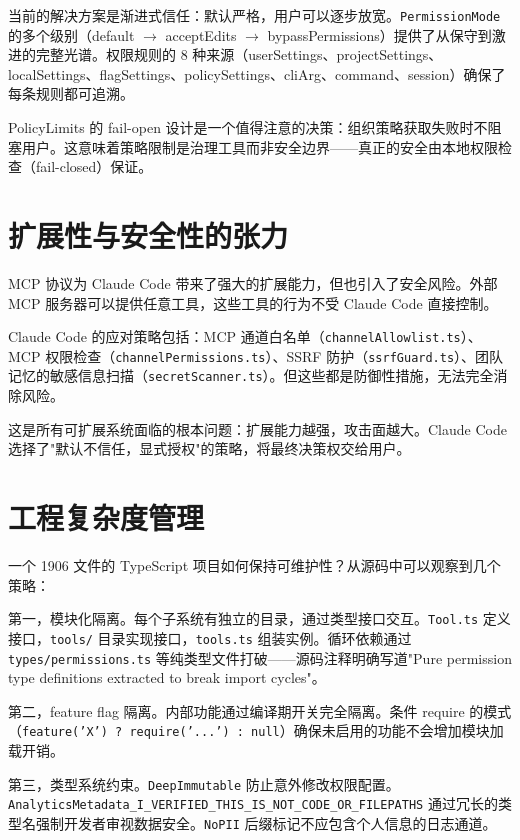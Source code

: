 当前的解决方案是渐进式信任：默认严格，用户可以逐步放宽。\texttt{PermissionMode} 的多个级别（default $\rightarrow$ acceptEdits $\rightarrow$ bypassPermissions）提供了从保守到激进的完整光谱。权限规则的 8 种来源（userSettings、projectSettings、localSettings、flagSettings、policySettings、cliArg、command、session）确保了每条规则都可追溯。

PolicyLimits 的 fail-open 设计是一个值得注意的决策：组织策略获取失败时不阻塞用户。这意味着策略限制是治理工具而非安全边界——真正的安全由本地权限检查（fail-closed）保证。

\section{扩展性与安全性的张力}

MCP 协议为 Claude Code 带来了强大的扩展能力，但也引入了安全风险。外部 MCP 服务器可以提供任意工具，这些工具的行为不受 Claude Code 直接控制。

Claude Code 的应对策略包括：MCP 通道白名单（\texttt{channelAllowlist.ts}）、MCP 权限检查（\texttt{channelPermissions.ts}）、SSRF 防护（\texttt{ssrfGuard.ts}）、团队记忆的敏感信息扫描（\texttt{secretScanner.ts}）。但这些都是防御性措施，无法完全消除风险。

这是所有可扩展系统面临的根本问题：扩展能力越强，攻击面越大。Claude Code 选择了"默认不信任，显式授权"的策略，将最终决策权交给用户。

\section{工程复杂度管理}

一个 1906 文件的 TypeScript 项目如何保持可维护性？从源码中可以观察到几个策略：

第一，模块化隔离。每个子系统有独立的目录，通过类型接口交互。\texttt{Tool.ts} 定义接口，\texttt{tools/} 目录实现接口，\texttt{tools.ts} 组装实例。循环依赖通过 \texttt{types/permissions.ts} 等纯类型文件打破——源码注释明确写道"Pure permission type definitions extracted to break import cycles"。

第二，feature flag 隔离。内部功能通过编译期开关完全隔离。条件 require 的模式（\texttt{feature('X') ? require('...') : null}）确保未启用的功能不会增加模块加载开销。

第三，类型系统约束。\texttt{DeepImmutable} 防止意外修改权限配置。\texttt{AnalyticsMetadata\_I\_VERIFIED\_THIS\_IS\_NOT\_CODE\_OR\_FILEPATHS} 通过冗长的类型名强制开发者审视数据安全。\texttt{NoPII} 后缀标记不应包含个人信息的日志通道。

